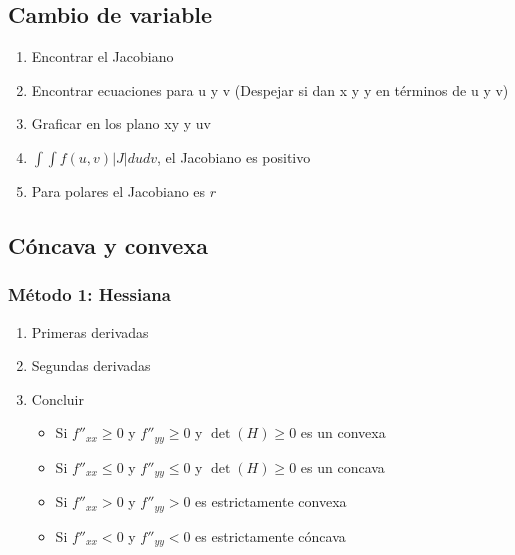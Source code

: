 \subsection{Cambio de variable}

\begin{enumerate}
	\item Encontrar el Jacobiano
	\item Encontrar ecuaciones para u y v (Despejar si dan x y y en términos de u y v)
	\item Graficar en los plano xy y uv
	\item $\int\int f(u,v)|J|dudv$, el Jacobiano es positivo 
	\item Para polares el Jacobiano es $r$
	
\end{enumerate}





\subsection{Cóncava y convexa}
\subsubsection{Método 1: Hessiana}
\begin{enumerate}
	\item Primeras derivadas
	\item Segundas derivadas
	\item Concluir
	\begin{itemize}
		\item Si $f''_{xx}\geq0$ y $f''_{yy}\geq0$ y $\det(H)\geq0$ es un convexa
		\item Si $f''_{xx}\leq0$ y $f''_{yy}\leq0$ y $\det(H)\geq0$ es un concava
		\item Si $f''_{xx}>0$ y $f''_{yy}>0$ es estrictamente convexa
		\item Si $f''_{xx}<0$ y $f''_{yy}<0$ es estrictamente cóncava
	\end{itemize}
\end{enumerate}

